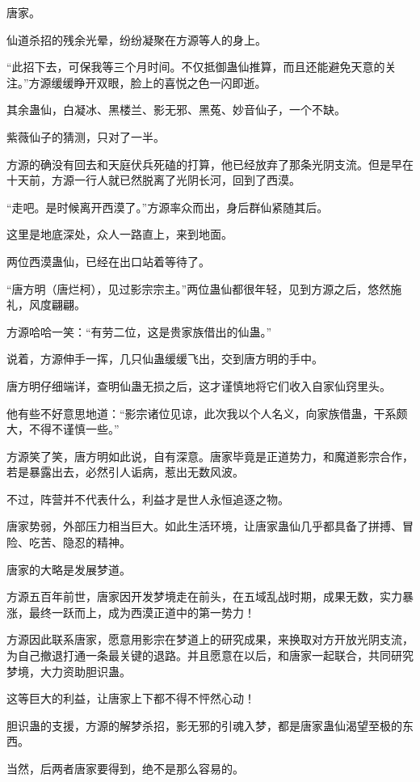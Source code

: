 \begin{this_body}
唐家。

仙道杀招的残余光晕，纷纷凝聚在方源等人的身上。

“此招下去，可保我等三个月时间。不仅抵御蛊仙推算，而且还能避免天意的关注。”方源缓缓睁开双眼，脸上的喜悦之色一闪即逝。

其余蛊仙，白凝冰、黑楼兰、影无邪、黑菟、妙音仙子，一个不缺。

紫薇仙子的猜测，只对了一半。

方源的确没有回去和天庭伏兵死磕的打算，他已经放弃了那条光阴支流。但是早在十天前，方源一行人就已然脱离了光阴长河，回到了西漠。

“走吧。是时候离开西漠了。”方源率众而出，身后群仙紧随其后。

这里是地底深处，众人一路直上，来到地面。

两位西漠蛊仙，已经在出口站着等待了。

“唐方明（唐烂柯），见过影宗宗主。”两位蛊仙都很年轻，见到方源之后，悠然施礼，风度翩翩。

方源哈哈一笑：“有劳二位，这是贵家族借出的仙蛊。”

说着，方源伸手一挥，几只仙蛊缓缓飞出，交到唐方明的手中。

唐方明仔细端详，查明仙蛊无损之后，这才谨慎地将它们收入自家仙窍里头。

他有些不好意思地道：“影宗诸位见谅，此次我以个人名义，向家族借蛊，干系颇大，不得不谨慎一些。”

方源笑了笑，唐方明如此说，自有深意。唐家毕竟是正道势力，和魔道影宗合作，若是暴露出去，必然引人诟病，惹出无数风波。

不过，阵营并不代表什么，利益才是世人永恒追逐之物。

唐家势弱，外部压力相当巨大。如此生活环境，让唐家蛊仙几乎都具备了拼搏、冒险、吃苦、隐忍的精神。

唐家的大略是发展梦道。

方源五百年前世，唐家因开发梦境走在前头，在五域乱战时期，成果无数，实力暴涨，最终一跃而上，成为西漠正道中的第一势力！

方源因此联系唐家，愿意用影宗在梦道上的研究成果，来换取对方开放光阴支流，为自己撤退打通一条最关键的退路。并且愿意在以后，和唐家一起联合，共同研究梦境，大力资助胆识蛊。

这等巨大的利益，让唐家上下都不得不怦然心动！

胆识蛊的支援，方源的解梦杀招，影无邪的引魂入梦，都是唐家蛊仙渴望至极的东西。

当然，后两者唐家要得到，绝不是那么容易的。

\end{this_body}

